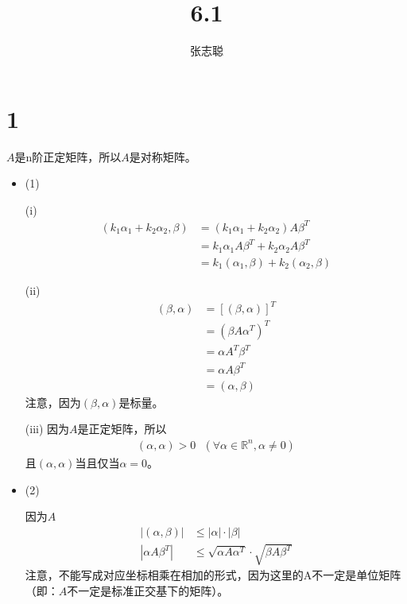 \documentclass{article}
\begin{document}
\title{6.1}
\author{张志聪}
\maketitle

\section*{1}

$A$是n阶正定矩阵，所以$A$是对称矩阵。

\begin{itemize}
  \item (1)

        (i)
        \begin{align*}
          (k_1 \alpha_1 + k_2 \alpha_2, \beta)
           & = (k_1 \alpha_1 + k_2 \alpha_2) A \beta^T         \\
           & = k_1 \alpha_1 A \beta^T + k_2 \alpha_2 A \beta^T \\
           & = k_1(\alpha_1, \beta) + k_2(\alpha_2, \beta)
        \end{align*}

        (ii)
        \begin{align*}
          (\beta, \alpha) & = [(\beta, \alpha)]^T  \\
                          & = (\beta A \alpha^T)^T \\
                          & = \alpha A^T \beta^T   \\
                          & = \alpha A \beta^T     \\
                          & = (\alpha, \beta)
        \end{align*}
        注意，因为$(\beta, \alpha)$是标量。

        (iii) 因为$A$是正定矩阵，所以
        \begin{align*}
          (\alpha, \alpha) > 0 \ \ \ (\forall \alpha \in \mathbb{R}^n, \alpha \neq 0)
        \end{align*}
        且$(\alpha, \alpha)$当且仅当$\alpha = 0$。

  \item (2)

        因为$A$
        \begin{align*}
          |(\alpha, \beta)|  & \leq |\alpha| \cdot |\beta|                                \\
          |\alpha A \beta^T| & \leq \sqrt{\alpha A \alpha^T} \cdot \sqrt{\beta A \beta^T}
        \end{align*}
        注意，不能写成对应坐标相乘在相加的形式，因为这里的A不一定是单位矩阵（即：$A$不一定是标准正交基下的矩阵）。
\end{itemize}
\end{document}
